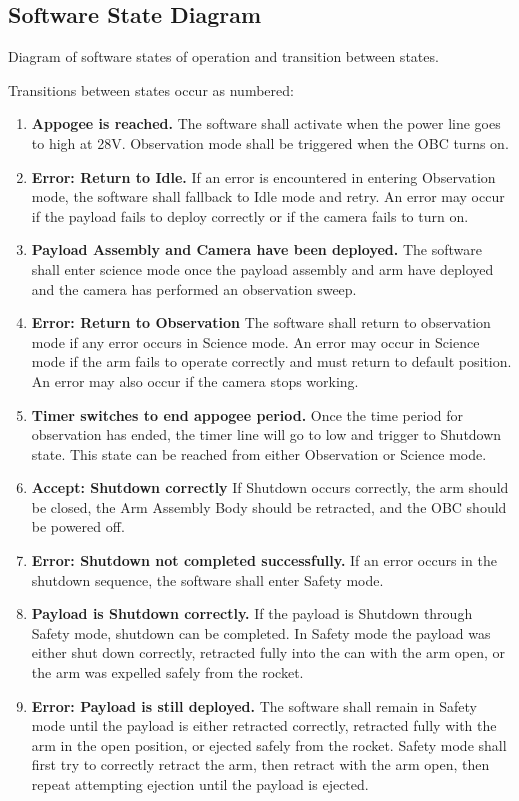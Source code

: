 \subsection{Software State Diagram}

\begin{center}
Diagram of software states of operation and transition between states.

Transitions between states occur as numbered:

\begin{enumerate}
\item{\textbf{Appogee is reached.} The software shall activate when the power line goes to high at 28V. Observation mode shall be triggered when the OBC turns on.}
\item{\textbf{Error: Return to Idle.} If an error is encountered in entering Observation mode, the software shall fallback to Idle mode and retry. An error may occur if the payload fails to deploy correctly or if the camera fails to turn on.}
\item{\textbf{Payload Assembly and Camera have been deployed.} The software shall enter science mode once the payload assembly and arm have deployed and the camera has performed an observation sweep.}
\item{\textbf{Error: Return to Observation} The software shall return to observation mode if any error occurs in Science mode. An error may occur in Science mode if the arm fails to operate correctly and must return to default position. An error may also occur if the camera stops working.}
\item{\textbf{Timer switches to end appogee period.} Once the time period for observation has ended, the timer line will go to low and trigger to Shutdown state. This state can be reached from either Observation or Science mode.}
\item{\textbf{Accept: Shutdown correctly} If Shutdown occurs correctly, the arm should be closed, the Arm Assembly Body should be retracted, and the OBC should be powered off.}
\item{\textbf{Error: Shutdown not completed successfully.} If an error occurs in the shutdown sequence, the software shall enter Safety mode.}
\item{\textbf{Payload is Shutdown correctly.} If the payload is Shutdown through Safety mode, shutdown can be completed. In Safety mode the payload was either shut down correctly, retracted fully into the can with the arm open, or the arm was expelled safely from the rocket.}
\item{\textbf{Error: Payload is still deployed.} The software shall remain in Safety mode until the payload is either retracted correctly, retracted fully with the arm in the open position, or ejected safely from the rocket. Safety mode shall first try to correctly retract the arm, then retract with the arm open, then repeat attempting ejection until the payload is ejected.}
\end{enumerate}


\end{center}
